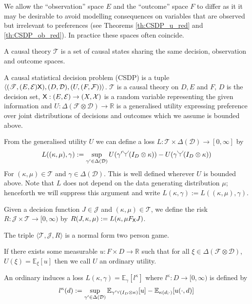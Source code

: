 We allow the ``observation'' space $E$ and the ``outcome'' space $F$ to differ as it it may be desirable to avoid modelling consequences on variables that are observed but irrelevant to preferences (see Theorems \ref{th:CSDP_u_red} and \ref{th:CSDP_ob_red}). In practice these spaces often coincide.

\begin{definition}\label{def:causal_theory}
A causal theory $\mathscr{T}$ is a set of causal states sharing the same decision, observation and outcome spaces.
\end{definition}

\begin{definition}\label{def:CSDP}
A causal statistical decision problem (CSDP) is a tuple $\langle (\mathscr{T}, (E,\mathcal{E}) \mathsf{X}), (D,\mathcal{D}), (U,(F,\mathcal{F})) \rangle$. $\mathscr{T}$ is a causal theory on $D, E$ and $F$, $D$ is the decision set, $\mathsf{X}:(E,\mathcal{E})\to (X,\mathcal{X})$ is a random variable representing the given information and $U:\Delta(\mathcal{F}\otimes \mathcal{D})\to \mathbb{R}$ is a generalised utility expressing preference over joint distributions of decisions and outcomes which we assume is bounded above.

From the generalised utility $U$ we can define a loss $L:\mathscr{T}\times\Delta(\mathcal{D})\to [0,\infty]$ by
\begin{align}
    L((\kappa,\mu),\gamma) := \sup_{\gamma'\in\Delta(\mathcal{D})} U(\gamma'\splitter{0.15}(I_D\otimes \kappa)) - U(\gamma\splitter{0.15}(I_D\otimes \kappa))\label{eq:canonical_loss}
\end{align}
For $(\kappa,\mu)\in \mathscr{T}$ and $\gamma\in \Delta(\mathcal{D})$. This is well defined wherever $U$ is bounded above. Note that $L$ does not depend on the data generating distribution $\mu$; henceforth we will suppress this argument and write $L(\kappa,\gamma):= L((\kappa,\mu),\gamma)$.

Given a decision function $J\in\mathscr{J}$ and $(\kappa,\mu)\in \mathscr{T}$, we define the risk $R:\mathscr{J}\times \mathscr{T}\to [0,\infty)$ by $R(J,\kappa,\mu) := L(\kappa,\mu F_{\mathsf{X}} J)$.

The triple $\langle \mathscr{T}, \mathscr{J}, R\rangle$ is a normal form two person game.

If there exists some measurable $u:F\times D\to \mathbb{R}$ such that for all $\xi\in \Delta(\mathcal{F}\otimes\mathcal{D})$, $U(\xi)=\mathbb{E}_{\xi}[u]$ then we call $U$ an ordinary utility.

An ordinary  induces a loss $L(\kappa,\gamma) = \mathbb{E}_{\gamma}[l^\kappa]$
where $l^\kappa:D\to [0,\infty)$ is defined by
\begin{align}
    l^\kappa(d) := \sup_{\gamma'\in \Delta(\mathcal{D})} \mathbb{E}_{\gamma'\splitter{0.08}(I_D\otimes \kappa)}[u] - \mathbb{E}_{\kappa(d;\cdot)}[u(\cdot,d)]\label{eq:induced_l}
\end{align}
\end{definition}

